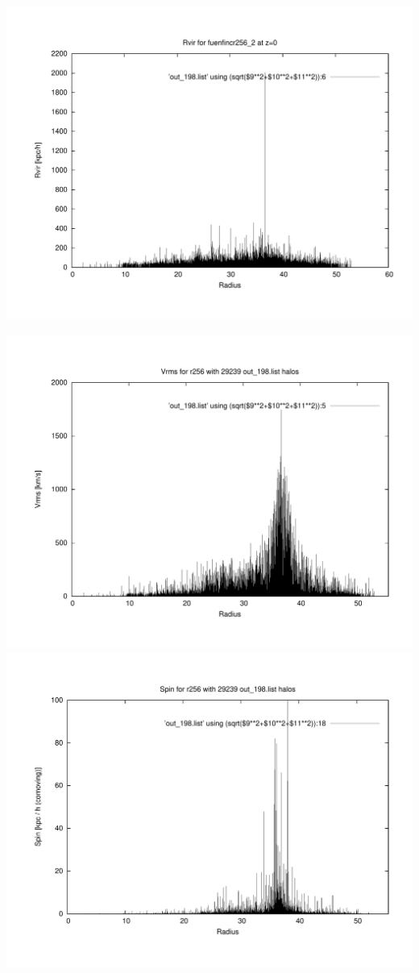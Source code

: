 \includegraphics[scale=0.3]{r256/fuenfincr256_2/plot_rvir_z0.pdf}

\includegraphics[scale=0.3]{r256/fuenfincr256_2/plot_Vrms_out_198.pdf}
\includegraphics[scale=0.3]{r256/fuenfincr256_2/plot_spin_out_198.pdf}

